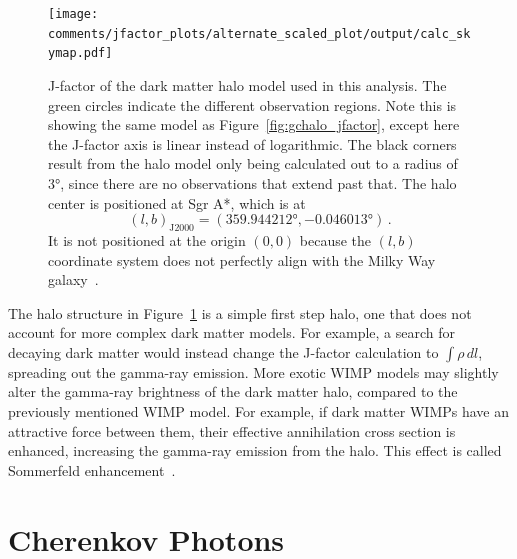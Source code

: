   \begin{figure}[!t]
    \centering
    \texttt{[image: comments/jfactor\_plots/alternate\_scaled\_plot/output/calc\_skymap.pdf]}
    \caption[Galactic Center Halo J-Factor Sky Map]{
      J-factor of the dark matter halo model used in this analysis.
      The green circles indicate the different observation regions.
      Note this is showing the same model as Figure~\ref{fig:gchalo_jfactor}, except here the J-factor axis is linear instead of logarithmic.
      The black corners result from the halo model only being calculated out to a radius of \ang{3}, since there are no observations that extend past that.
      The halo center is positioned at Sgr A*, which is at $$(l,b)_{\textrm{J2000}} = (\ang{359.944212}, \ang{-0.046013}) \,.$$
      It is not positioned at the origin $(0,0)$ because the $(l,b)$ coordinate system does not perfectly align with the Milky Way galaxy~\cite{galacticlb}.
    }
    \label{fig:halojfactor}
  \end{figure}

  The halo structure in Figure~\ref{fig:halojfactor} is a simple first step halo, one that does not account for more complex dark matter models.
  For example, a search for decaying dark matter would instead change the J-factor calculation to $\int \rho \, dl$, spreading out the gamma-ray emission.
  More exotic WIMP models may slightly alter the gamma-ray brightness of the dark matter halo, compared to the previously mentioned WIMP model.
  For example, if dark matter WIMPs have an attractive force between them, their effective annihilation cross section is enhanced, increasing the gamma-ray emission from the halo.
  This effect is called Sommerfeld enhancement~\cite{sommerfeld}.
    
  
  \FloatBarrier
    
\section{Cherenkov Photons}\label{sec:cherenkov}

